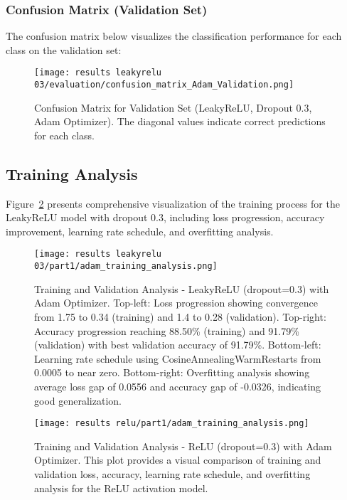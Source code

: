 \documentclass[12pt,a4paper]{article}
\begin{document}
\subsubsection{Confusion Matrix (Validation Set)}

The confusion matrix below visualizes the classification performance for each class on the validation set:

\begin{figure}[H]
\centering
\texttt{[image: results leakyrelu 03/evaluation/confusion\_matrix\_Adam\_Validation.png]}
\caption{Confusion Matrix for Validation Set (LeakyReLU, Dropout 0.3, Adam Optimizer). The diagonal values indicate correct predictions for each class.}
\label{fig:confmat_val}
\end{figure}

\subsection{Training Analysis}

Figure~\ref{fig:training_plots} presents comprehensive visualization of the training process for the LeakyReLU model with dropout 0.3, including loss progression, accuracy improvement, learning rate schedule, and overfitting analysis.

\begin{figure}[H]
\centering
\texttt{[image: results leakyrelu 03/part1/adam\_training\_analysis.png]}
\caption{Training and Validation Analysis - LeakyReLU (dropout=0.3) with Adam Optimizer. Top-left: Loss progression showing convergence from 1.75 to 0.34 (training) and 1.4 to 0.28 (validation). Top-right: Accuracy progression reaching 88.50\% (training) and 91.79\% (validation) with best validation accuracy of 91.79\%. Bottom-left: Learning rate schedule using CosineAnnealingWarmRestarts from 0.0005 to near zero. Bottom-right: Overfitting analysis showing average loss gap of 0.0556 and accuracy gap of -0.0326, indicating good generalization.}
\label{fig:training_plots}
\end{figure}

\begin{figure}[H]
\centering
\texttt{[image: results relu/part1/adam\_training\_analysis.png]}
\caption{Training and Validation Analysis - ReLU (dropout=0.3) with Adam Optimizer. This plot provides a visual comparison of training and validation loss, accuracy, learning rate schedule, and overfitting analysis for the ReLU activation model.}
\label{fig:training_plots_relu}
\end{figure}
\end{document}
